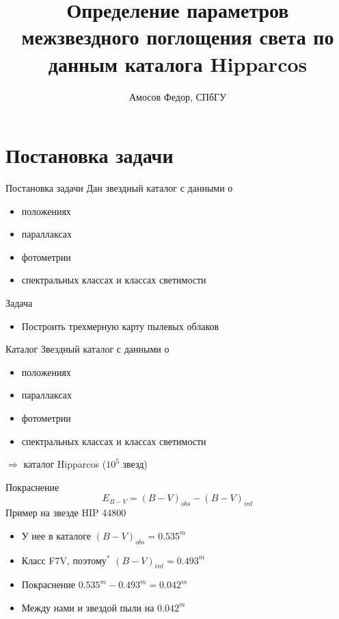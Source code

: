 \documentclass[14pt, fleqn, xcolor={dvipsnames, table}]{beamer}
\title{Определение параметров межзвездного поглощения света по данным каталога Hipparcos\\\small{}}
\author[]{
    \small{
        Амосов Федор, СПбГУ\\
    }
}
\date{}
\begin{document}
    \begin{frame}
        \maketitle
        \small
    \end{frame}
    
     \section{Постановка задачи} 

        \begin{frame}{Постановка задачи}
            Дан звездный каталог с данными о
            \begin{itemize}
                \item положениях
                \item параллаксах
                \item фотометрии
                \item спектральных классах и классах светимости
            \end{itemize}  
            Задача
            \begin{itemize}
                \item Построить трехмерную карту пылевых облаков 
            \end{itemize}         
        \end{frame}
        
        \begin{frame}{Каталог}
            Звездный каталог с данными о
            \begin{itemize}
                \item положениях
                \item параллаксах
                \item фотометрии
                \item спектральных классах и классах светимости
            \end{itemize}  
            $\Longrightarrow$ каталог Hipparcos ($10^5$ звезд)
        \end{frame}
        
        \begin{frame}{Покраснение}
            $$
                E_{B - V} = (B - V)_{obs} - (B - V)_{int}
            $$
            Пример на звезде HIP 44800
            \begin{itemize}
                \item У нее в каталоге $(B - V)_{obs} = 0.535^m$
                \item Класс F7V, поэтому$^*$ $(B - V)_{int} = 0.493^m$
                \item Покраснение $0.535^m - 0.493^m = 0.042^m$
                \item Между нами и звездой пыли на $0.042^m$
            \end{itemize}
        \end{frame}    
\end{document}
